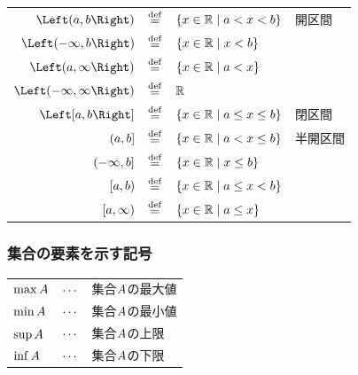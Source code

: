 \documentclass[a4j, 9pt]{ltjsarticle}
\begin{document}
        \begin{center}
          \begin{tablehere}
            \centering
            \begin{tabular}{rcll}
              
              $\ds \Left( a, b \Right)$             & $\displaystyle \stackrel{\mathrm{def}}{=}$ & $\displaystyle \{ x \in \mathbb{R} \mid a < x < b \}$       & 開区間\\
              $\ds \Left( -\infty, b \Right)$       & $\displaystyle \stackrel{\mathrm{def}}{=}$ & $\displaystyle \{ x \in \mathbb{R} \mid x < b \}$           & \\
              $\ds \Left( a, \infty \Right)$        & $\displaystyle \stackrel{\mathrm{def}}{=}$ & $\displaystyle \{ x \in \mathbb{R} \mid a < x \}$           & \\
              $\ds \Left( -\infty, \infty \Right)$  & $\displaystyle \stackrel{\mathrm{def}}{=}$ & $\displaystyle \mathbb{R}$                                  & \\
              $\ds \Left[ a, b \Right]$             & $\displaystyle \stackrel{\mathrm{def}}{=}$ & $\displaystyle \{ x \in \mathbb{R} \mid a \leq x \leq b \}$ & 閉区間\\
              $\displaystyle ( a, b ]$                        & $\displaystyle \stackrel{\mathrm{def}}{=}$ & $\displaystyle \{ x \in \mathbb{R} \mid a < x \leq b \}$    & 半開区間\\
              $\displaystyle ( -\infty, b ]$                  & $\displaystyle \stackrel{\mathrm{def}}{=}$ & $\displaystyle \{ x \in \mathbb{R} \mid x \leq b \}$        & \\
              $\displaystyle [ a, b )$                        & $\displaystyle \stackrel{\mathrm{def}}{=}$ & $\displaystyle \{ x \in \mathbb{R} \mid a \leq x < b \}$    & \\
              $\displaystyle [ a, \infty )$                   & $\displaystyle \stackrel{\mathrm{def}}{=}$ & $\displaystyle \{ x \in \mathbb{R} \mid a \leq x \}$        & \\
              
            \end{tabular}
          \end{tablehere}
        \end{center}

      \subsubsection{集合の要素を示す記号}

        \blank

        \begin{center}
          \begin{tablehere}
            \centering
            \begin{tabular}{lcl}
              
              $\displaystyle \max A$  & $\displaystyle \cdots$  & 集合$\displaystyle A$の最大値\\
              $\displaystyle \min A$  & $\displaystyle \cdots$  & 集合$\displaystyle A$の最小値\\
              $\displaystyle \sup A$  & $\displaystyle \cdots$  & 集合$\displaystyle A$の上限\\
              $\displaystyle \inf A$  & $\displaystyle \cdots$  & 集合$\displaystyle A$の下限\\
              
            \end{tabular}
          \end{tablehere}
        \end{center}
\end{document}
